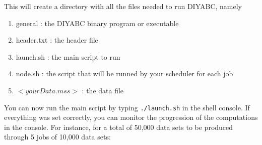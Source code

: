  This will create a directory with all the files needed to run DIYABC, namely
\begin{enumerate}
    \item \textsf{general} : the DIYABC binary program or executable
    \item \textsf{header.txt} : the header file
    \item \textsf{launch.sh} : the main script to run
    \item \textsf{node.sh} : the script that will be runned by your scheduler for each job
    \item \textsf{$<yourData.mss>$} : the data file 
\end{enumerate}
You can now run the main script by typing \texttt{./launch.sh} in the
shell console. If everything was set correctly, you can monitor the progression of the computations in the console. For instance, for a total of 50,000 data sets to be produced through 5 jobs of 10,000 data sets:\\
